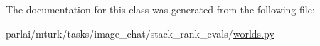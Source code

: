 The documentation for this class was generated from the following file\+:\begin{DoxyCompactItemize}
\item 
parlai/mturk/tasks/image\+\_\+chat/stack\+\_\+rank\+\_\+evals/\hyperlink{parlai_2mturk_2tasks_2image__chat_2stack__rank__evals_2worlds_8py}{worlds.\+py}\end{DoxyCompactItemize}
